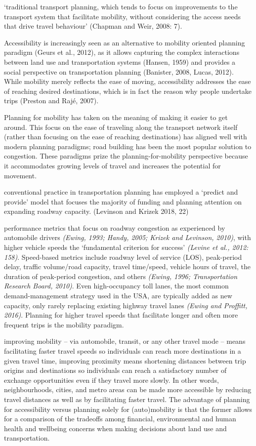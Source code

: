 \documentclass[12pt,]{article}
\begin{document}
`traditional transport planning, which tends to focus on improvements to
the transport system that facilitate mobility, without considering the
access needs that drive travel behaviour' (Chapman and Weir, 2008: 7).

Accessibility is increasingly seen as an alternative to mobility
oriented planning paradigm (Geurs et al., 2012), as it allows capturing
the complex interactions between land use and transportation systems
(Hansen, 1959) and provides a social perspective on transportation
planning (Banister, 2008, Lucas, 2012). While mobility merely reflects
the ease of moving, accessibility addresses the ease of reaching desired
destinations, which is in fact the reason why people undertake trips
(Preston and Rajé, 2007).

Planning for mobility has taken on the meaning of making it easier to
get around. This focus on the ease of traveling along the transport
network itself (rather than focusing on the ease of reaching
destinations) has aligned well with modern planning paradigms; road
building has been the most popular solution to congestion. These
paradigms prize the planning-for-mobility perspective because it
accommodates growing levels of travel and increases the potential for
movement.

conventional practice in transportation planning has employed a `predict
and provide' model that focuses the majority of funding and planning
attention on expanding roadway capacity. (Levinson and Krizek 2018, 22)

performance metrics that focus on roadway congestion as experienced by
automobile drivers \emph{(Ewing, 1993; Handy, 2005; Krizek and Levinson,
2010)}, with higher vehicle speeds the `fundamental criterion for
success' \emph{(Levine et al., 2012: 158)}. Speed-based metrics include
roadway level of service (LOS), peak-period delay, traffic volume/road
capacity, travel time/speed, vehicle hours of travel, the duration of
peak-period congestion, and others \emph{(Ewing, 1996; Transportation
Research Board, 2010)}. Even high-occupancy toll lanes, the most common
demand-management strategy used in the USA, are typically added as new
capacity, only rarely replacing existing highway travel lanes
\emph{(Ewing and Proffitt, 2016)}. Planning for higher travel speeds
that facilitate longer and often more frequent trips is the mobility
paradigm.

improving mobility -- via automobile, transit, or any other travel mode
-- means facilitating faster travel speeds so individuals can reach more
destinations in a given travel time, improving proximity means
shortening distances between trip origins and destinations so
individuals can reach a satisfactory number of exchange opportunities
even if they travel more slowly. In other words, neighbourhoods, cities,
and metro areas can be made more accessible by reducing travel distances
as well as by facilitating faster travel. The advantage of planning for
accessibility versus planning solely for (auto)mobility is that the
former allows for a comparison of the tradeoffs among financial,
environmental and human health and wellbeing concerns when making
decisions about land use and transportation.
\end{document}
